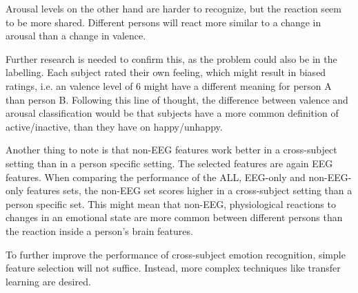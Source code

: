 \npar

Arousal levels on the other hand are harder to recognize, but the reaction seem to be more shared. Different persons will react more similar to a change in arousal than a change in valence.

\npar

Further research is needed to confirm this, as the problem could also be in the labelling. Each subject rated their own feeling, which might result in biased ratings, i.e. an valence level of 6 might have a different meaning for person A than person B. Following this line of thought, the difference between valence and arousal classification would be that subjects have a more common definition of active/inactive, than they have on happy/unhappy.

\npar

Another thing to note is that non-EEG features work better in a cross-subject setting than in a person specific setting. The selected features are again EEG features. When comparing the performance of the ALL, EEG-only and non-EEG-only features sets, the non-EEG set scores higher in a cross-subject setting than a person specific set. This might mean that non-EEG, physiological reactions to changes in an emotional state are more common between different persons than the reaction inside a person's brain features.

\npar

To further improve the performance of cross-subject emotion recognition, simple feature selection will not suffice. Instead, more complex techniques like transfer learning are desired. 